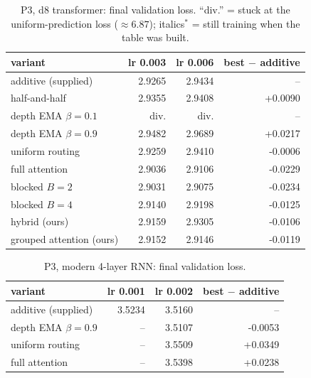 \begin{table}[H]\centering\small
\caption{P3, d8 transformer: final validation loss. ``div.'' = stuck at the uniform-prediction loss ($\approx 6.87$); italics$^*$ = still training when the table was built.}\label{tab:p3d8}
\begin{tabular}{lrrr}\toprule
variant & lr 0.003 & lr 0.006 & best $-$ additive \\\midrule
additive (supplied) & 2.9265 & 2.9434 & -- \\
half-and-half & 2.9355 & 2.9408 & +0.0090 \\
depth EMA $\beta=0.1$ & div. & div. & -- \\
depth EMA $\beta=0.9$ & 2.9482 & 2.9689 & +0.0217 \\
uniform routing & 2.9259 & 2.9410 & -0.0006 \\
full attention & 2.9036 & 2.9106 & -0.0229 \\
blocked $B=2$ & 2.9031 & 2.9075 & -0.0234 \\
blocked $B=4$ & 2.9140 & 2.9198 & -0.0125 \\
hybrid (ours) & 2.9159 & 2.9305 & -0.0106 \\
grouped attention (ours) & 2.9152 & 2.9146 & -0.0119 \\
\bottomrule\end{tabular}\end{table}
\begin{table}[H]\centering\small
\caption{P3, modern 4-layer RNN: final validation loss.}\label{tab:p3rnn}
\begin{tabular}{lrrr}\toprule
variant & lr 0.001 & lr 0.002 & best $-$ additive \\\midrule
additive (supplied) & 3.5234 & 3.5160 & -- \\
depth EMA $\beta=0.9$ & -- & 3.5107 & -0.0053 \\
uniform routing & -- & 3.5509 & +0.0349 \\
full attention & -- & 3.5398 & +0.0238 \\
\bottomrule\end{tabular}\end{table}